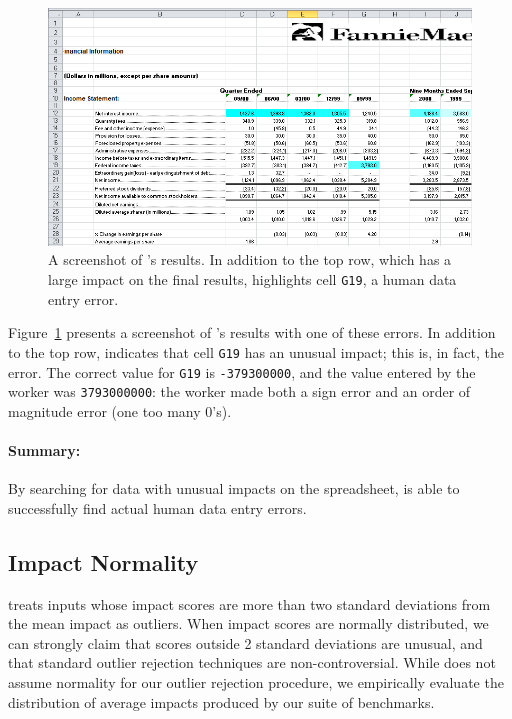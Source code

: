 \begin{figure}[!t]
\centering
\includegraphics[width=5.5in]{images/fannie_mae_outlier}
  \caption{A screenshot of \checkcell{}'s results. In addition to the top row, which has a large impact on the final results, \checkcell{} highlights cell \texttt{G19}, a human data entry error.\label{fig:fannie_mae}}
\end{figure}

Figure~\ref{fig:fannie_mae} presents a screenshot of \checkcell{}'s
results with one of these errors. In addition to the top
row, \checkcell{} indicates that cell \texttt{G19} has an unusual
impact; this is, in fact, the error. The correct value
for \texttt{G19} is \texttt{-379300000}, and the value entered by the
worker was \texttt{3793000000}: the worker made both a sign error and
an order of magnitude error (one too many 0's).

\paragraph{Summary:} By searching for data with unusual impacts on the spreadsheet, \checkcell{} is able to successfully find actual human data entry errors.

\subsection{Impact Normality}
\label{sec:impact_normal}

\checkcell{} treats inputs whose impact scores are more than two standard deviations from the mean impact as outliers.  When impact scores are normally distributed, we can strongly claim that scores outside 2 standard deviations are unusual, and that standard outlier rejection techniques are non-controversial.  While \checkcell{} does not assume normality for our outlier rejection procedure, we empirically evaluate the distribution of average impacts produced by our suite of benchmarks.


